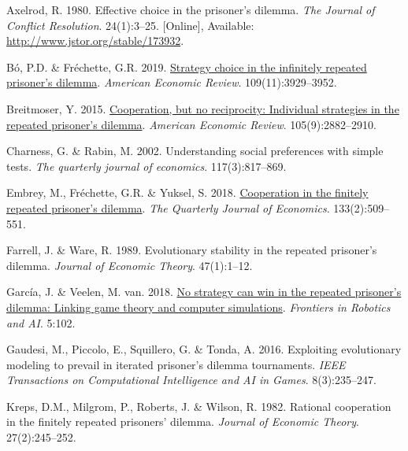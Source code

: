 \documentclass[11pt,preprint]{elsarticle}
\numberwithin{equation}{section}
\numberwithin{figure}{section}
\numberwithin{table}{section}
\newlength{\cslhangindent}
\newenvironment{CSLReferences}[2] %
{\begin{list}{}{%
	\setlength{\itemindent}{0pt}
	\setlength{\leftmargin}{0pt}
	\setlength{\parsep}{0pt}
	\ifodd #1
	\setlength{\leftmargin}{\cslhangindent}
	\setlength{\itemindent}{-1\cslhangindent}
	\fi
	\setlength{\itemsep}{#2\baselineskip}}}
{\end{list}}
\begin{document}
\label{refs}
\begin{CSLReferences}{1}{1}
Axelrod, R. 1980. Effective choice in the prisoner's dilemma. \emph{The
Journal of Conflict Resolution}. 24(1):3--25. {[}Online{]}, Available:
\url{http://www.jstor.org/stable/173932}.

Bó, P.D. \& Fréchette, G.R. 2019.
\href{https://doi.org/10.1257/aer.20181480}{Strategy choice in the
infinitely repeated prisoner's dilemma}. \emph{American Economic
Review}. 109(11):3929--3952.

Breitmoser, Y. 2015.
\href{https://doi.org/10.1257/aer.20130675}{Cooperation, but no
reciprocity: Individual strategies in the repeated prisoner's dilemma}.
\emph{American Economic Review}. 105(9):2882--2910.

Charness, G. \& Rabin, M. 2002. Understanding social preferences with
simple tests. \emph{The quarterly journal of economics}.
117(3):817--869.

Embrey, M., Fréchette, G.R. \& Yuksel, S. 2018.
\href{https://doi.org/10.1093/qje/qjx033}{Cooperation in the finitely
repeated prisoner's dilemma}. \emph{The Quarterly Journal of Economics}.
133(2):509--551.

Farrell, J. \& Ware, R. 1989. Evolutionary stability in the repeated
prisoner's dilemma. \emph{Journal of Economic Theory}. 47(1):1--12.

García, J. \& Veelen, M. van. 2018.
\href{https://doi.org/10.3389/frobt.2018.00102}{No strategy can win in
the repeated prisoner's dilemma: Linking game theory and computer
simulations}. \emph{Frontiers in Robotics and AI}. 5:102.

Gaudesi, M., Piccolo, E., Squillero, G. \& Tonda, A. 2016. Exploiting
evolutionary modeling to prevail in iterated prisoner's dilemma
tournaments. \emph{IEEE Transactions on Computational Intelligence and
AI in Games}. 8(3):235--247.

Kreps, D.M., Milgrom, P., Roberts, J. \& Wilson, R. 1982. Rational
cooperation in the finitely repeated prisoners' dilemma. \emph{Journal
of Economic Theory}. 27(2):245--252.


\end{CSLReferences}
\end{document}
